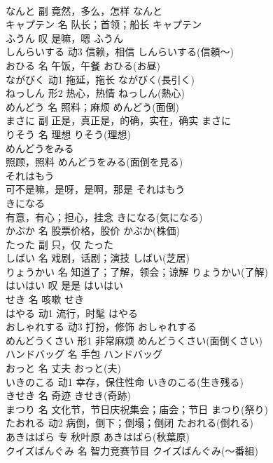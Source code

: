\documentclass[8pt]{extreport}
\begin{document}
\begin{CJK}{UTF8}{min}
\\	なんと	副	竟然，多么，怎样	なんと	
\\	キャプテン	名	队长；首领；船长	キャプテン	
\\	ふうん	叹	是嘛，嗯	ふうん	
\\	しんらいする	动3	信赖，相信	しんらいする(信頼～)	
\\	おひる	名	午饭，午餐	おひる(お昼)	
\\	ながびく	动1	拖延，拖长	ながびく(長引く)	
\\	ねっしん	形2	热心，热情	ねっしん(熱心)	
\\	めんどう	名	照料；麻烦	めんどう(面倒)	
\\	まさに	副	正是，真正是，的确，实在，确实	まさに	
\\	りそう	名	理想	りそう(理想)	
\\	めんどうをみる	
\\	照顾，照料	めんどうをみる(面倒を見る)	
\\	それはもう	
\\	可不是嘛，是呀，是啊，那是	それはもう	
\\	きになる	
\\	有意，有心；担心，挂念	きになる(気になる)	
\\	かぶか	名	股票价格，股价	かぶか(株価)	
\\	たった	副	只，仅	たった	
\\	しばい	名	戏剧，话剧；演技	しばい(芝居)	
\\	りょうかい	名	知道了；了解，领会；谅解	りょうかい(了解)	
\\	はいはい	叹	是是	はいはい	
\\	せき	名	咳嗽	せき	
\\	はやる	动1	流行，时髦	はやる	
\\	おしゃれする	动3	打扮，修饰	おしゃれする	
\\	めんどうくさい	形1	非常麻烦	めんどうくさい(面倒くさい)	
\\	ハンドバッグ	名	手包	ハンドバッグ	
\\	おっと	名	丈夫	おっと(夫)	
\\	いきのこる	动1	幸存，保住性命	いきのこる(生き残る)	
\\	きせき	名	奇迹	きせき(奇跡)	
\\	まつり	名	文化节，节日庆祝集会；庙会；节日	まつり(祭り)	
\\	たおれる	动2	病倒，倒下；倒塌；倒闭	たおれる(倒れる)	
\\	あきはばら	专	秋叶原	あきはばら(秋葉原)	
\\	クイズばんぐみ	名	智力竞赛节目	クイズばんぐみ(～番組)	

\end{CJK}
\end{document}
